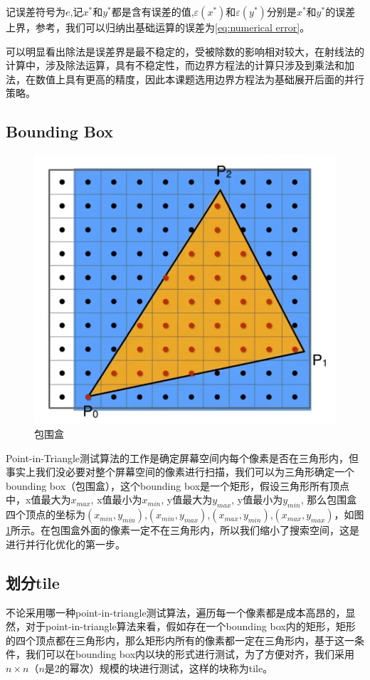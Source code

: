 记误差符号为$e$,记$x^*$和$y^*$都是含有误差的值,$\varepsilon (x^*)$和$\varepsilon (y^*)$分别是$x^*$和$y^*$的误差上界，参考\cite{na}，我们可以归纳出基础运算的误差为\ref{eq:numerical error}。

可以明显看出除法是误差界是最不稳定的，受被除数的影响相对较大，在射线法的计算中，涉及除法运算，具有不稳定性，而边界方程法的计算只涉及到乘法和加法，在数值上具有更高的精度，因此本课题选用边界方程法为基础展开后面的并行策略。


\subsection{Bounding Box}

\begin{figure}[H]
    \centering
    \includegraphics[width=.5\textwidth]{figure/bdbox.png}
    \caption{包围盒}
    \label{fig:bdbox}
\end{figure}

Point-in-Triangle测试算法的工作是确定屏幕空间内每个像素是否在三角形内，但事实上我们没必要对整个屏幕空间的像素进行扫描，我们可以为三角形确定一个bounding box（包围盒），这个bounding box是一个矩形，假设三角形所有顶点中，x值最大为$x_{max}$, x值最小为$x_{min}$, y值最大为$y_{max}$, y值最小为$y_{min}$, 那么包围盒四个顶点的坐标为$(x_{min},y_{min})$,$(x_{min},y_{max})$,$(x_{max},y_{min} )$,$(x_{max},y_{max})$，如图\ref{fig:bdbox}所示。在包围盒外面的像素一定不在三角形内，所以我们缩小了搜索空间，这是进行并行化优化的第一步。



\subsection{划分tile}

不论采用哪一种point-in-triangle测试算法，遍历每一个像素都是成本高昂的，显然，对于point-in-triangle算法来看，假如存在一个bounding box内的矩形，矩形的四个顶点都在三角形内，那么矩形内所有的像素都一定在三角形内，基于这一条件，我们可以在bounding box内以块的形式进行测试，为了方便对齐，我们采用$n\times n$（$n$是2的幂次）规模的块进行测试，这样的块称为tile。

